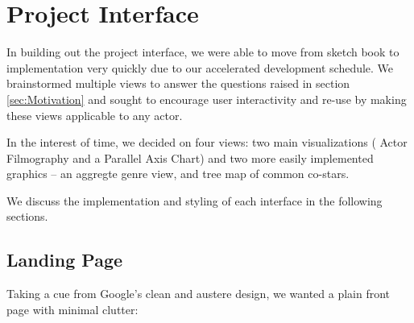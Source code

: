 \documentclass[12pt]{article}
\begin{document}
	
	
	


\newpage 

\section{Project Interface}
In building out the project interface, we were able to move from sketch book to implementation very quickly due to our accelerated development schedule. We brainstormed multiple views to answer the questions raised in section \ref{sec:Motivation} and sought to encourage user interactivity and re-use by making these views applicable to any actor.  

In the interest of time, we  decided on four views:  two main visualizations ( Actor Filmography and a Parallel Axis Chart) and two more easily implemented graphics -- an aggregte genre view, and tree map of common co-stars.

We discuss the implementation and styling of each interface in the following sections.

\subsection{Landing Page}

  Taking a cue from Google's clean and austere design, we wanted a plain front page with minimal clutter:
  
\end{document}
